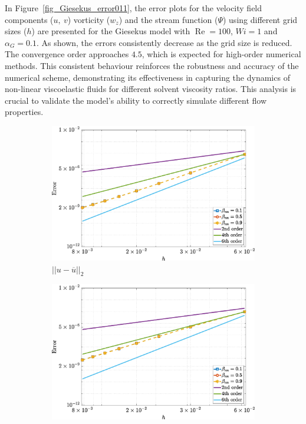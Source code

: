\documentclass[preprint, 12pt]{elsarticle}
\begin{document}
In Figure~\ref{fig_Giesekus_error011}, the error plots for the velocity field components ($u,~v$) vorticity ($w_z$) and the stream function ($\Psi$) using different grid sizes ($h$) are presented for the Giesekus model with $\operatorname{Re} = 100$, $Wi = 1$ and $\alpha_G = 0.1$. As shown, the errors consistently decrease as the grid size is reduced. The convergence order approaches $4.5$, which is expected for high-order numerical methods. This consistent behaviour reinforces the robustness and accuracy of the numerical scheme, demonstrating its effectiveness in capturing the dynamics of non-linear viscoelastic fluids for different solvent viscosity ratios. This analysis is crucial to validate the model’s ability to correctly simulate different flow properties.
\begin{figure}[H]
    \centering  
    \begin{subfigure}[b]{.46\textwidth}
        \includegraphics[width=\textwidth]{NormErr_2nd_Re_100_Wi_1_epsilon_0_xi_0_alphaG_0.1_Dt_1e-06_at_0.05_tipsim_1_MMS_12_U.eps}
        \caption{$||u - \overline{u}||_{2}$}
        \label{error_u_2nd_Case1_giesekus_alphaG_0.1}
    \end{subfigure}
    \vspace{0.2cm}
    \qquad
    \begin{subfigure}[b]{.46\textwidth}
        \includegraphics[width=\textwidth]{NormErr_2nd_Re_100_Wi_1_epsilon_0_xi_0_alphaG_0.1_Dt_1e-06_at_0.05_tipsim_1_MMS_12_V.eps}

\end{subfigure}
\end{figure}
\end{document}
